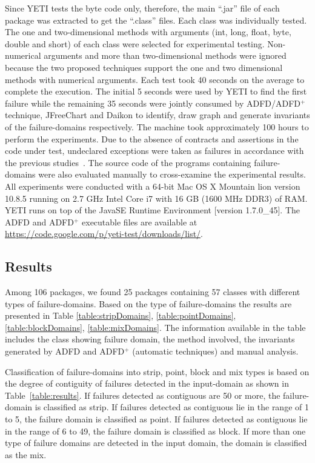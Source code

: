 Since YETI tests the byte code only, therefore, the main ``.jar'' file of each package was extracted to get the ``.class'' files. Each class was individually tested. The one and two-dimensional methods with arguments (int, long, float, byte, double and short) of each class were selected for experimental testing. Non-numerical arguments and more than two-dimensional methods were ignored because the two proposed techniques support the one and two dimensional methods with numerical arguments. Each test took 40 seconds on the average to complete the execution. The initial 5 seconds were used by YETI to find the first failure while the remaining 35 seconds were jointly consumed by ADFD/ADFD$^+$ technique, JFreeChart and Daikon to identify, draw graph and generate invariants of the failure-domains respectively. The machine took approximately 100 hours to perform the experiments. Due to the absence of contracts and assertions in the code under test, undeclared exceptions were taken as failures in accordance with the previous studies~\cite{oriol2012random, ahmad2013adfd}. The source code of the programs containing failure-domains were also evaluated manually to cross-examine the experimental results. All experiments were conducted with a 64-bit Mac OS X Mountain lion version 10.8.5 running on 2.7 GHz Intel Core i7 with 16 GB (1600 MHz DDR3) of RAM. YETI runs on top of the Java\texttrademark  SE Runtime Environment [version 1.7.0\_45]. The ADFD and ADFD$^+$ executable files are available at \url{https://code.google.com/p/yeti-test/downloads/list/}. 



\subsection{Results}
Among 106 packages, we found 25 packages containing 57 classes with different types of failure-domains. Based on the type of failure-domains the results are presented in Table \ref{table:stripDomains}, \ref{table:pointDomains}, \ref{table:blockDomains}, \ref{table:mixDomains}. The information available in the table includes the class showing failure domain, the method involved, the invariants generated by ADFD and ADFD$^+$ (automatic techniques) and manual analysis. 

Classification of failure-domains into strip, point, block and mix types is based on the degree of contiguity of failures detected in the input-domain as shown in Table~\ref{table:results}. If failures detected as contiguous are 50 or more, the failure-domain is classified as strip.  If failures detected as contiguous lie in the range of 1 to 5, the failure domain is classified as point. If failures detected as contiguous lie in the range of 6 to 49, the failure domain is classified as block. If more than one type of failure domains are detected in the input domain, the domain is classified as the mix.
\bigskip

